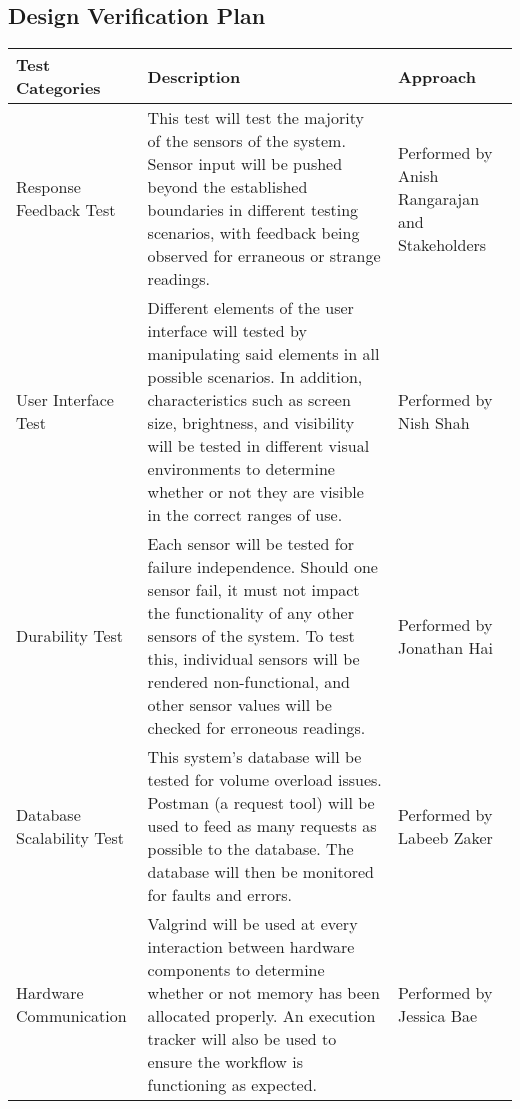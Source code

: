 \documentclass[12pt, titlepage]{article}
\begin{document}
\subsection{Design Verification Plan}
\begin{tabular}{|p{2cm}|p{8cm}|p{4cm}|}
  \hline
  \label{sec_4_3}\textbf{Test Categories} & \textbf{Description}                                                                                                                                                                                                                                                                                                 & \textbf{Approach}                      \\
  \hline
  Response Feedback Test                  & This test will test the majority of the sensors of the system. Sensor input will be pushed beyond the established boundaries in different testing scenarios, with feedback being observed for erraneous or strange readings.
 & Performed by Anish Rangarajan and Stakeholders\\
  \hline
  User Interface Test                     & Different elements of the user interface will tested by manipulating said elements in all possible scenarios. In addition, characteristics such as screen size, brightness, and visibility will be tested in different visual environments to determine whether or not they are visible in the correct ranges of use.                                                                                                              & Performed by Nish Shah                \\
  \hline
  Durability Test                         & Each sensor will be tested for failure independence. Should one sensor fail, it must not impact the functionality of any other sensors of the system. To test this, individual sensors will be rendered non-functional, and other sensor values will be checked for erroneous readings.                                                                         & Performed by Jonathan Hai                \\
  \hline
  Database Scalability Test               & This system's database will be tested for volume overload issues. Postman (a request tool) will be used to feed as many requests as possible to the database. The database will then be monitored for faults and errors. & Performed by Labeeb Zaker                \\
  \hline
  Hardware Communication                  & Valgrind will be used at every interaction between hardware components to determine whether or not memory has been allocated properly. An execution tracker will also be used to ensure the workflow is functioning as expected.                                                                                                          & Performed by Jessica Bae                \\
  \hline
\end{tabular}
\pagebreak
\end{document}
